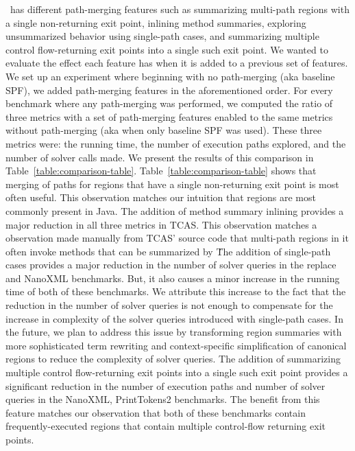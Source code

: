 \tool\ has different path-merging features such as summarizing multi-path regions with a single non-returning exit
point, inlining method summaries, exploring unsummarized behavior using single-path cases, and summarizing multiple
control flow-returning exit points into a single such exit point.
%
We wanted to evaluate the effect each feature has when it is added to a previous set of features.
%
We set up an experiment where beginning with no path-merging (aka baseline SPF), we added path-merging features in the
aforementioned order.
%
For every benchmark where any path-merging was performed, we computed the ratio of three metrics with a set of
path-merging features enabled to the same metrics without path-merging (aka when only baseline SPF was used).
%
These three metrics were: the running time, the number of execution paths explored, and the number of solver calls made.
%
We present the results of this comparison in Table~\ref{table:comparison-table}.
%
Table~\ref{table:comparison-table} shows that merging of paths for regions that have a single non-returning exit point
is most often useful.
%
This observation matches our intuition that regions are most commonly present in Java.
%
The addition of method summary inlining provides a major reduction in all three metrics in TCAS.
%
This observation matches a observation made manually from TCAS' source code that multi-path regions in it often invoke
methods that can be summarized by \tool\.
%
The addition of single-path cases provides a major reduction in the number of solver queries in the replace and
NanoXML benchmarks.
%
But, it also causes a minor increase in the running time of both of these benchmarks.
%
We attribute this increase to the fact that the reduction in the number of solver queries is not enough to compensate
for the increase in complexity of the solver queries introduced with single-path cases.
%
In the future, we plan to address this issue by transforming region summaries with more sophisticated term rewriting
and context-specific simplification of canonical regions to reduce the complexity of solver queries.
%
The addition of summarizing multiple control flow-returning exit points into a single such exit point provides a
significant reduction in the number of execution paths and number of solver queries in the NanoXML, PrintTokens2
benchmarks.
%
The benefit from this feature matches our observation that both of these benchmarks contain frequently-executed
regions that contain multiple control-flow returning exit points.